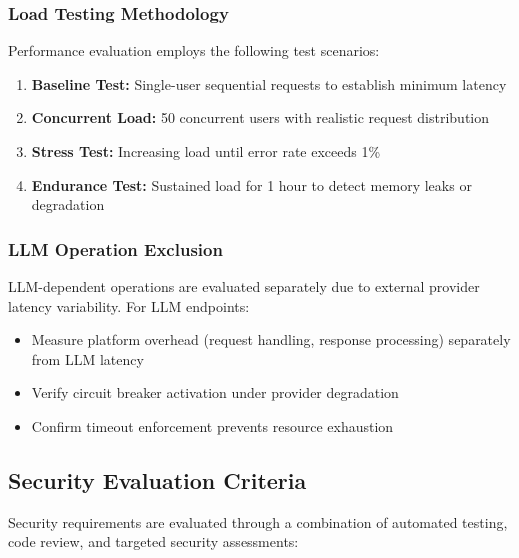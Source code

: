 \subsubsection{Load Testing Methodology}

Performance evaluation employs the following test scenarios:

\begin{enumerate}
    \item \textbf{Baseline Test:} Single-user sequential requests to establish minimum latency
    \item \textbf{Concurrent Load:} 50 concurrent users with realistic request distribution
    \item \textbf{Stress Test:} Increasing load until error rate exceeds 1\%
    \item \textbf{Endurance Test:} Sustained load for 1 hour to detect memory leaks or degradation
\end{enumerate}

\subsubsection{LLM Operation Exclusion}

LLM-dependent operations are evaluated separately due to external provider latency variability. For LLM endpoints:
\begin{itemize}
    \item Measure platform overhead (request handling, response processing) separately from LLM latency
    \item Verify circuit breaker activation under provider degradation
    \item Confirm timeout enforcement prevents resource exhaustion
\end{itemize}

\subsection{Security Evaluation Criteria}
\label{subsec:security-criteria}

Security requirements are evaluated through a combination of automated testing, code review, and targeted security assessments:

